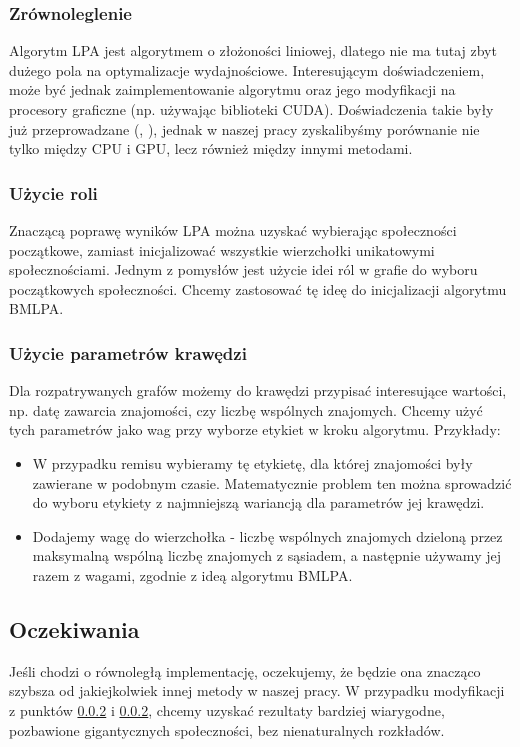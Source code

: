 \documentclass{article}
\begin{document}
\subsubsection{Zrównoleglenie}
Algorytm LPA jest algorytmem o złożoności liniowej, dlatego nie ma tutaj zbyt dużego pola na optymalizacje wydajnościowe. Interesującym doświadczeniem, może być jednak zaimplementowanie algorytmu oraz jego modyfikacji na procesory graficzne (np. używając biblioteki CUDA). Doświadczenia takie były już przeprowadzane (\cite{ms-paper5}, \cite{ms-paper6}), jednak w naszej pracy zyskalibyśmy porównanie nie tylko między CPU i GPU, lecz również między innymi metodami.
\subsubsection{Użycie roli}
\label{subsubsection:lparole}
Znaczącą poprawę wyników LPA można uzyskać wybierając społeczności początkowe, zamiast inicjalizować wszystkie wierzchołki unikatowymi społecznościami. Jednym z pomysłów jest użycie idei ról w grafie do wyboru początkowych społeczności\cite{ms-paper7}. Chcemy zastosować tę ideę do inicjalizacji algorytmu BMLPA.
\subsubsection{Użycie parametrów krawędzi}
\label{subsubsection:lpaedges}
Dla rozpatrywanych grafów możemy do krawędzi przypisać interesujące wartości, np. datę zawarcia znajomości, czy liczbę wspólnych znajomych. Chcemy użyć tych parametrów jako wag przy wyborze etykiet w kroku algorytmu. Przykłady:
\begin{itemize}
\item W przypadku remisu wybieramy tę etykietę, dla której znajomości były zawierane w podobnym czasie. Matematycznie problem ten można sprowadzić do wyboru etykiety z najmniejszą wariancją dla parametrów jej krawędzi.
\item Dodajemy wagę do wierzchołka - liczbę wspólnych znajomych dzieloną przez maksymalną wspólną liczbę znajomych z sąsiadem, a następnie używamy jej razem z wagami, zgodnie z ideą algorytmu BMLPA.
\end{itemize}

\subsection{Oczekiwania}
Jeśli chodzi o równoległą implementację, oczekujemy, że będzie ona znacząco szybsza od jakiejkolwiek innej metody w naszej pracy. W przypadku modyfikacji z punktów \ref{subsubsection:lparole} i \ref{subsubsection:lparole}, chcemy uzyskać rezultaty bardziej wiarygodne, pozbawione gigantycznych społeczności, bez nienaturalnych rozkładów.
\end{document}
